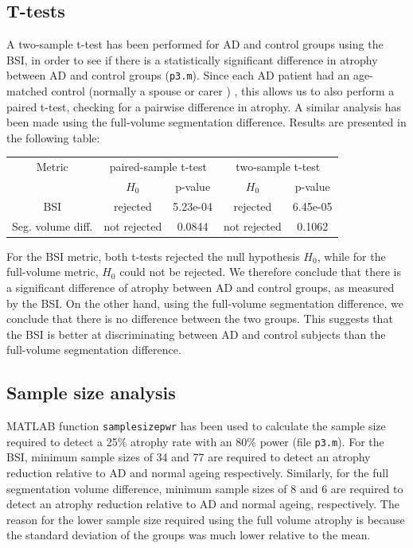 \documentclass[11pt,a4paper,oneside]{report}
\begin{document}
\subsection*{T-tests}

A two-sample t-test has been performed for AD and control groups using the BSI, in order to see if there is a statistically significant difference in atrophy between AD and control groups (\texttt{p3.m}). Since each AD patient had an age-matched control (normally a spouse or carer ) \cite{malone2013miriad}, this allows us to also perform a paired t-test, checking for a pairwise difference in atrophy. A similar analysis has been made using the full-volume segmentation difference. Results are presented in the following table:\\

\begin{center}
 \begin{tabular}{c | c | c | c | c}
 Metric & \multicolumn{2}{c|}{paired-sample t-test} & \multicolumn{2}{c}{two-sample t-test}\\  
 & $H_0$ & p-value & $H_0$ & p-value\\
 \hline
 BSI & \cellcolor{green!15} rejected & 5.23e-04& \cellcolor{green!15}rejected & 6.45e-05\\
 Seg. volume diff. & \cellcolor{red!15} not rejected & 0.0844 & \cellcolor{red!15} not rejected & 0.1062\\
 \end{tabular}
\end{center}

For the BSI metric, both t-tests rejected the null hypothesis $H_0$, while for the full-volume metric, $H_0$ could not be rejected. We therefore conclude that there is a significant difference of atrophy between AD and control groups, as measured by the BSI. On the other hand, using the full-volume segmentation difference, we conclude that there is no difference between the two groups. This suggests that the BSI is better at discriminating between AD and control subjects than the full-volume segmentation difference. 

\subsection*{Sample size analysis}

MATLAB function \texttt{samplesizepwr} has been used to calculate the sample size required to detect a 25\% atrophy rate with an 80\% power (file \texttt{p3.m}). For the BSI, minimum sample sizes of 34 and 77 are required to detect an atrophy reduction relative to AD and normal ageing respectively. Similarly, for the full segmentation volume difference, minimum sample sizes of 8 and 6 are required to detect an atrophy reduction relative to AD and normal ageing, respectively. The reason for the lower sample size required using the full volume atrophy is because the standard deviation of the groups was much lower relative to the mean.
\end{document}
